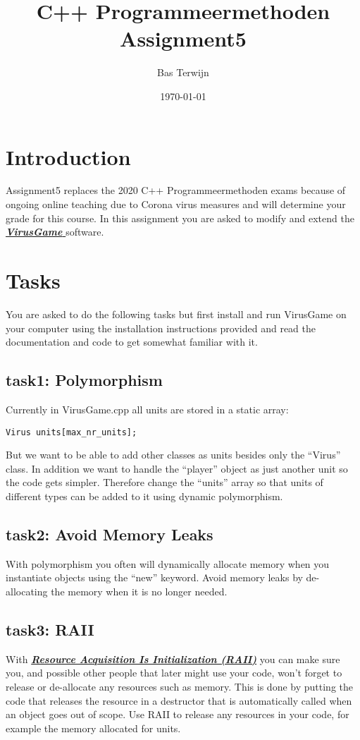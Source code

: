 \documentclass[12pt]{article}
\title{C++ Programmeermethoden Assignment5}
\author{Bas Terwijn}
\date{\today}
\newcommand*{\link}[2]{\href{#1}{\color{blue}\textbf{\textit{#2}}}}
\begin{document}
\maketitle

\section{Introduction}
Assignment5 replaces the 2020 C++ Programmeermethoden exams because of
ongoing online teaching due to Corona virus measures and will
determine your grade for this course. In this assignment you are asked
to modify and extend the
\link{https://bitbucket.org/bterwijn/virusgame} { VirusGame }
software.
     
\section{Tasks}
You are asked to do the following tasks but first install and run
VirusGame on your computer using the installation instructions
provided and read the documentation and code to get somewhat
familiar with it.

\subsection{task1: Polymorphism}
Currently in VirusGame.cpp all units are stored in a static array:

\begin{tcolorbox}
\begin{verbatim}
Virus units[max_nr_units];
\end{verbatim}
\end{tcolorbox}

But we want to be able to add other classes as units besides only the
``Virus'' class. In addition we want to handle the ``player'' object as
just another unit so the code gets simpler. Therefore change the
``units'' array so that units of different types can be added to it
using dynamic polymorphism.

\subsection{task2: Avoid Memory Leaks}
With polymorphism you often will dynamically allocate memory when you
instantiate objects using the ``new'' keyword. Avoid memory leaks by
de-allocating the memory when it is no longer needed.

\subsection{task3: RAII}
With \link{https://en.cppreference.com/w/cpp/language/raii}{Resource
  Acquisition Is Initialization (RAII)} you can make sure you, and
possible other people that later might use your code, won't forget to
release or de-allocate any resources such as memory. This is done by
putting the code that releases the resource in a destructor that is
automatically called when an object goes out of scope. Use RAII to
release any resources in your code, for example the memory allocated
for units.
\end{document}
